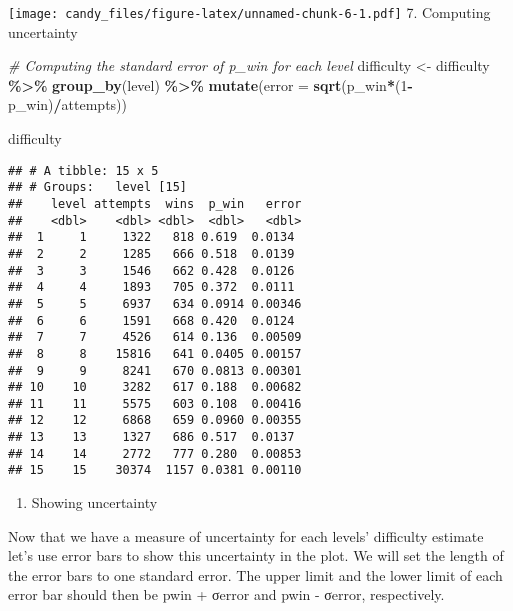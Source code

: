 \documentclass[
]{article}
\newenvironment{Shaded}{\begin{snugshade}}{\end{snugshade}}
\newcommand{\AttributeTok}[1]{\textcolor[rgb]{0.13,0.29,0.53}{#1}}
\newcommand{\CommentTok}[1]{\textcolor[rgb]{0.56,0.35,0.01}{\textit{#1}}}
\newcommand{\DecValTok}[1]{\textcolor[rgb]{0.00,0.00,0.81}{#1}}
\newcommand{\FunctionTok}[1]{\textcolor[rgb]{0.13,0.29,0.53}{\textbf{#1}}}
\newcommand{\NormalTok}[1]{#1}
\newcommand{\OtherTok}[1]{\textcolor[rgb]{0.56,0.35,0.01}{#1}}
\newcommand{\SpecialCharTok}[1]{\textcolor[rgb]{0.81,0.36,0.00}{\textbf{#1}}}
\providecommand{\tightlist}{%
  \setlength{\itemsep}{0pt}\setlength{\parskip}{0pt}}
\begin{document}
\texttt{[image: candy\_files/figure-latex/unnamed-chunk-6-1.pdf]} 7.
Computing uncertainty

\begin{Shaded}
\begin{Highlighting}[]
\CommentTok{\# Computing the standard error of p\_win for each level}
\NormalTok{difficulty }\OtherTok{\textless{}{-}}\NormalTok{ difficulty }\SpecialCharTok{\%\textgreater{}\%}
    \FunctionTok{group\_by}\NormalTok{(level) }\SpecialCharTok{\%\textgreater{}\%}
    \FunctionTok{mutate}\NormalTok{(}\AttributeTok{error =} \FunctionTok{sqrt}\NormalTok{(p\_win}\SpecialCharTok{*}\NormalTok{(}\DecValTok{1}\SpecialCharTok{{-}}\NormalTok{p\_win)}\SpecialCharTok{/}\NormalTok{attempts))}

\NormalTok{difficulty}
\end{Highlighting}
\end{Shaded}

\begin{verbatim}
## # A tibble: 15 x 5
## # Groups:   level [15]
##    level attempts  wins  p_win   error
##    <dbl>    <dbl> <dbl>  <dbl>   <dbl>
##  1     1     1322   818 0.619  0.0134 
##  2     2     1285   666 0.518  0.0139 
##  3     3     1546   662 0.428  0.0126 
##  4     4     1893   705 0.372  0.0111 
##  5     5     6937   634 0.0914 0.00346
##  6     6     1591   668 0.420  0.0124 
##  7     7     4526   614 0.136  0.00509
##  8     8    15816   641 0.0405 0.00157
##  9     9     8241   670 0.0813 0.00301
## 10    10     3282   617 0.188  0.00682
## 11    11     5575   603 0.108  0.00416
## 12    12     6868   659 0.0960 0.00355
## 13    13     1327   686 0.517  0.0137 
## 14    14     2772   777 0.280  0.00853
## 15    15    30374  1157 0.0381 0.00110
\end{verbatim}

\begin{enumerate}
\def\labelenumi{\arabic{enumi}.}
\setcounter{enumi}{7}
\tightlist
\item
  Showing uncertainty
\end{enumerate}

Now that we have a measure of uncertainty for each levels' difficulty
estimate let's use error bars to show this uncertainty in the plot. We
will set the length of the error bars to one standard error. The upper
limit and the lower limit of each error bar should then be pwin + σerror
and pwin - σerror, respectively.
\end{document}
